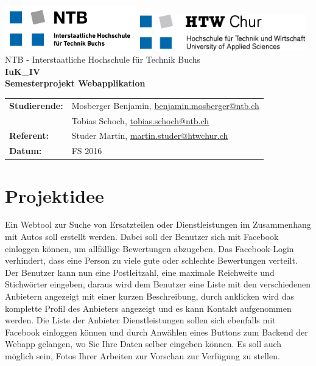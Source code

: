 \documentclass[11pt,a4paper]{scrreprt}
\begin{document}
\thispagestyle{empty}
\begin{center}
	\includegraphics[height=2cm]{./Bilder/logo_ntb.png}
	\hspace*{3cm}
	\includegraphics[height=1.6cm]{./Bilder/logo_htw.png}\\
	\vspace{3cm}
	\Large{NTB - Interstaatliche Hochschule für Technik Buchs}\\
	\vspace{4cm}
	\textbf{IuK\_IV}\\
	\textbf{Semesterprojekt Webapplikation}\\
	\vspace{6cm}
	\large{}
	\doublespacing
	\begin{tabular}{ll}
		\textbf{Studierende:} & Mosberger Benjamin, \href{mailto:benjamin.mosberger@ntb.ch}{benjamin.mosberger@ntb.ch}\\ 
		& Tobias Schoch, \href{mailto:tobias.schoch@ntb.ch}{tobias.schoch@ntb.ch}\\ 
		\textbf{Referent:} & Studer Martin, \href{mailto: martin.studer@htwchur.ch}{martin.studer@htwchur.ch} \\
		\textbf{Datum:} & FS 2016
	\end{tabular}
\end{center}
\restoregeometry
\pagebreak


\tableofcontents 
\pagebreak


\chapter{Projektidee}
Ein Webtool zur Suche von Ersatzteilen oder Dienstleistungen im Zusammenhang mit Autos soll erstellt werden. Dabei soll der Benutzer sich mit Facebook einloggen können, um allfällige Bewertungen abzugeben. Das Facebook-Login verhindert, dass eine Person zu viele gute oder schlechte Bewertungen verteilt. Der Benutzer kann nun eine Postleitzahl, eine maximale Reichweite und Stichwörter eingeben, daraus wird dem Benutzer eine Liste mit den verschiedenen Anbietern angezeigt mit einer kurzen Beschreibung, durch anklicken wird das komplette Profil des Anbieters angezeigt und es kann Kontakt aufgenommen werden. Die Liste der Anbieter Dienstleistungen sollen sich ebenfalls mit Facebook einloggen können und durch Anwählen eines Buttons zum Backend der Webapp gelangen, wo Sie Ihre Daten selber eingeben können. Es soll auch möglich sein, Fotos Ihrer Arbeiten zur Vorschau zur Verfügung zu stellen. 
\end{document}
